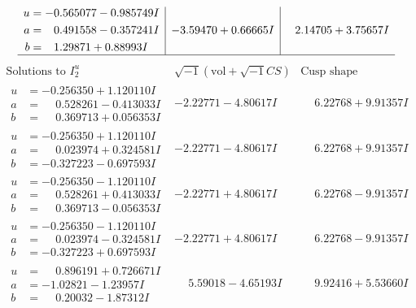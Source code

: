 \documentclass[1p]{elsarticle_modified}
\theoremstyle{definition}
\newcommand{\I}{\sqrt{-1}}
\begin{document}
$$\begin{array}{c|c|c}
\begin{aligned}
u &= -0.565077 - 0.985749 I \\
a &= \phantom{-}0.491558 - 0.357241 I \\
b &= \phantom{-}1.29871 + 0.88993 I\end{aligned}
 & -3.59470 + 0.66665 I & \phantom{-}2.14705 + 3.75657 I\\
 \hline 
 \end{array}$$\newpage$$\begin{array}{c|c|c}  
\text{Solutions to }I^u_{2}& \I (\text{vol} + \sqrt{-1}CS) & \text{Cusp shape}\\
 \hline 
\begin{aligned}
u &= -0.256350 + 1.120110 I \\
a &= \phantom{-}0.528261 - 0.413033 I \\
b &= \phantom{-}0.369713 + 0.056353 I\end{aligned}
 & -2.22771 - 4.80617 I & \phantom{-}6.22768 + 9.91357 I \\ \hline\begin{aligned}
u &= -0.256350 + 1.120110 I \\
a &= \phantom{-}0.023974 + 0.324581 I \\
b &= -0.327223 - 0.697593 I\end{aligned}
 & -2.22771 - 4.80617 I & \phantom{-}6.22768 + 9.91357 I \\ \hline\begin{aligned}
u &= -0.256350 - 1.120110 I \\
a &= \phantom{-}0.528261 + 0.413033 I \\
b &= \phantom{-}0.369713 - 0.056353 I\end{aligned}
 & -2.22771 + 4.80617 I & \phantom{-}6.22768 - 9.91357 I \\ \hline\begin{aligned}
u &= -0.256350 - 1.120110 I \\
a &= \phantom{-}0.023974 - 0.324581 I \\
b &= -0.327223 + 0.697593 I\end{aligned}
 & -2.22771 + 4.80617 I & \phantom{-}6.22768 - 9.91357 I \\ \hline\begin{aligned}
u &= \phantom{-}0.896191 + 0.726671 I \\
a &= -1.02821 - 1.23957 I \\
b &= \phantom{-}0.20032 - 1.87312 I\end{aligned}
 & \phantom{-}5.59018 - 4.65193 I & \phantom{-}9.92416 + 5.53660 I \\ \hline\begin{aligned}

\end{aligned}
\end{array}$$
\end{document}
